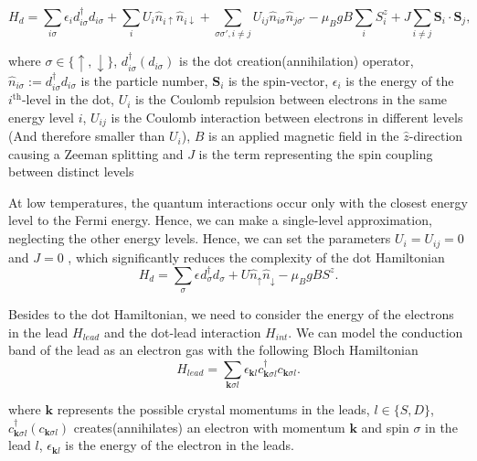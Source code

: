 \begin{equation}
H_{d}=\sum_{i\sigma}\epsilon_{i}d_{i\sigma}^{\dagger}d_{i\sigma}+\sum_{i}U_{i}\hat{n}_{i\uparrow}\hat{n}_{i\downarrow}+\sum_{\sigma\sigma',i\neq j}U_{ij}\hat{n}_{i\sigma}\hat{n}_{j\sigma'}-\mu_{B}gB\sum_{i}S_{i}^{z}+J\sum_{i\neq j}\mathbf{S}_{i}\cdot\mathbf{S}_{j},
\end{equation}




\noindent where $\sigma\in\{\uparrow,\downarrow\}$, $d_{i\sigma}^{\dagger}\left(d_{i\sigma}\right)$
is the dot creation(annihilation) operator,$\hat{n}_{i\sigma}:=d_{i\sigma}^{\dagger}d_{i\sigma}$
is the particle number, $\mathbf{S}_{i}$ is the spin-vector, $\epsilon_{i}$
is the energy of the $i^{\mbox{th}}$-level in the dot, $U_{i}$ is
the Coulomb repulsion between electrons in the same energy level $i$,
$U_{ij}$ is the Coulomb interaction between electrons in different
levels (And therefore smaller than $U_{i}$), \textbf{$B$} is an
applied magnetic field in the $\hat{z}$-direction causing a Zeeman splitting and $J$ is the
term representing the spin coupling between distinct levels

At low temperatures, the quantum interactions occur only with the closest energy level to the Fermi energy. Hence, we can make a single-level approximation, neglecting the other energy levels. Hence, we can set the parameters $U_i=U_{ij}=0$ and $J=0$ , which significantly reduces the complexity of the dot Hamiltonian \\


\begin{equation}
    H_{d}=\sum_{\sigma}\epsilon_{}d_{\sigma}^{\dagger}d_{\sigma}+U\hat{n}_{\uparrow}\hat{n}_{\downarrow}-\mu_{B}gBS^{z}. \label{eq:hdot}
\end{equation}

Besides to the dot Hamiltonian, we need to consider the energy of the electrons in the lead $H_{lead}$ and the dot-lead interaction $H_{int}$. We can model  the conduction band of the lead as an electron gas with the following Bloch Hamiltonian
\begin{equation}
H_{lead}  =  \sum_{\mathbf{k}\sigma l}\epsilon_{\mathbf{k}l}c_{\mathbf{k}\sigma l}^{\dagger}c_{\mathbf{k}\sigma l}. 
\end{equation}

\noindent where $\mathbf{k}$ represents the possible crystal momentums in the
leads, $l\in\{S,D\}$, $c_{\mathbf{k}\sigma l}^{\dagger}(c_{\mathbf{k}\sigma l})$
creates(annihilates) an electron with momentum $\mathbf{k}$ and spin
$\sigma$ in the lead $l$, $\epsilon_{\mathbf{k}l}$ is the energy
of the electron in the leads. 

